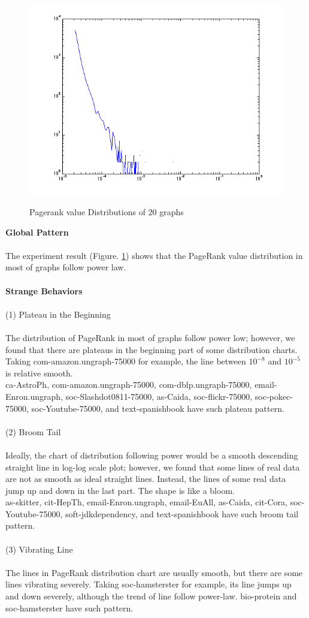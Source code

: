 \begin{figure}
  {\includegraphics[width=.25\linewidth]{FIG/pagerank/soft-jdkdependency.txt.png}} \hfill  
  \hfill  
\caption{Pagerank value Distributions of 20 graphs}
\label{fig:pagerank}
\end{figure}

\textbf{Global Pattern}
\\
\\
The experiment result (Figure. \ref{fig:pagerank}) shows that the PageRank value distribution in most of graphs follow power law.
\\
\\
\textbf{Strange Behaviors}
\\
\\
(1) Plateau in the Beginning
\\
\\
The distribution of PageRank in most of graphs follow power low; however, we found that there are plateaus in the beginning part of some distribution charts. Taking com-amazon.ungraph-75000 for example, the line between $10^{-8}$ and $10^{-5}$ is relative smooth. 
\\
ca-AstroPh, com-amazon.ungraph-75000, com-dblp.ungraph-75000, email-Enron.ungraph, soc-Slashdot0811-75000, as-Caida, soc-flickr-75000, soc-pokec-75000, soc-Youtube-75000, and text-spanishbook have such plateau pattern.
\\
\\
(2) Broom Tail
\\
\\
Ideally, the chart of distribution following power would be a smooth descending straight line in log-log scale plot; however, we found that some lines of real data are not as smooth as ideal straight lines. Instead, the lines of some real data jump up and down in the last part. The shape is like a bloom.
\\
as-skitter, cit-HepTh, email-Enron.ungraph, email-EuAll, as-Caida, cit-Cora, soc-Youtube-75000, soft-jdkdependency, and text-spanishbook have such broom tail pattern.
\\
\\
(3) Vibrating Line
\\
\\
The lines in PageRank distribution chart are usually smooth, but there are some lines vibrating severely. Taking soc-hamsterster for example, its line jumps up and down severely, although the trend of line follow power-law. bio-protein and soc-hamsterster have such pattern.

